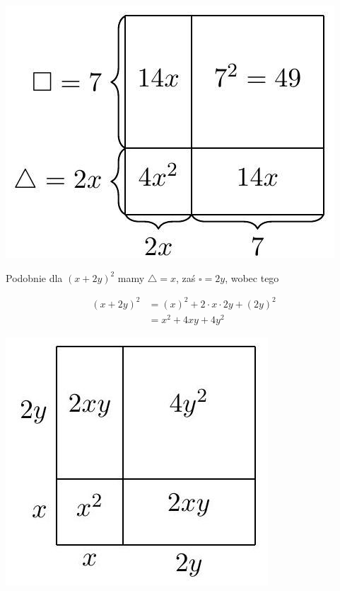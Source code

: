 \documentclass[10pt]{article}
\begin{document}
\begin{center}
\includegraphics[max width=\textwidth]{2024_11_21_71f62bd117d375398909g-069(1)}
\end{center}

Podobnie dla \((x+2 y)^{2}\) mamy \(\triangle=x\), zaś \(\square=2 y\), wobec tego

\[
\begin{aligned}
(x+2 y)^{2} & =(x)^{2}+2 \cdot x \cdot 2 y+(2 y)^{2} \\
& =x^{2}+4 x y+4 y^{2}
\end{aligned}
\]

\begin{center}
\includegraphics[max width=\textwidth]{2024_11_21_71f62bd117d375398909g-070}
\end{center}
\end{document}
